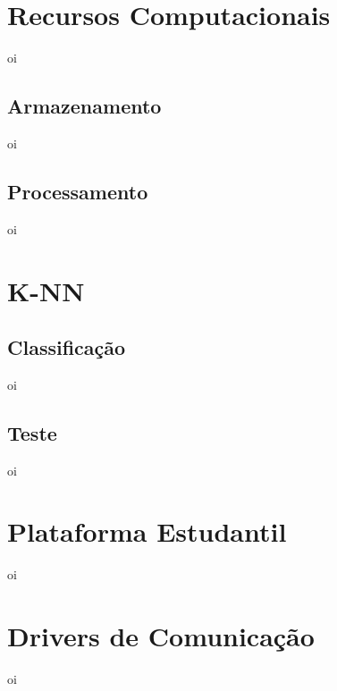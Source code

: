 \section{Recursos Computacionais}
\label{sec:recursos-computacionais }
oi

    \subsection{Armazenamento}
    \label{sec:armazenamento}
    oi
    
    \subsection{Processamento}
    \label{sec:processamento}
    oi

\section{K-NN}
\label{sec:knn}
    \subsection{Classificação}
    \label{sec:classificacao}
    oi
    
    \subsection{Teste}
    \label{sec:teste}
    oi

\section{Plataforma Estudantil}
\label{sec:plataforma-estudantil}
oi

\section{Drivers de Comunicação}
\label{sec:drivers-comunicacao}
oi

